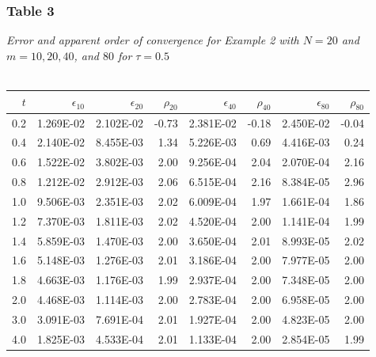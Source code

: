 \documentclass[letterpaper, 12pt]{article}
\begin{document}
	\subsubsection*{Table 3} \small\textit{Error and apparent order of convergence for Example 2 with $N=20$ and\\$m=10,20,40$, and $80$ for $\tau=0.5$} \\\\
	\normalsize
	\begin{tabular}{r||rrrrrrr}
		\hline
		$t$  &$\epsilon_{10}$  &$\epsilon_{20}$  &$\rho_{20}$  &$\epsilon_{40}$  &$\rho_{40}$  &$\epsilon_{80}$  &$\rho_{80}$ \\ 
		\hline
		0.2    &1.269E-02    &2.102E-02        &-0.73    &2.381E-02        &-0.18    &2.450E-02        &-0.04 \\ 
		0.4    &2.140E-02    &8.455E-03         &1.34    &5.226E-03         &0.69    &4.416E-03         &0.24 \\ 
		0.6    &1.522E-02    &3.802E-03         &2.00    &9.256E-04         &2.04    &2.070E-04         &2.16 \\ 
		0.8    &1.212E-02    &2.912E-03         &2.06    &6.515E-04         &2.16    &8.384E-05         &2.96 \\ 
		1.0    &9.506E-03    &2.351E-03         &2.02    &6.009E-04         &1.97    &1.661E-04         &1.86 \\ 
		1.2    &7.370E-03    &1.811E-03         &2.02    &4.520E-04         &2.00    &1.141E-04         &1.99 \\ 
		1.4    &5.859E-03    &1.470E-03         &2.00    &3.650E-04         &2.01    &8.993E-05         &2.02 \\ 
		1.6    &5.148E-03    &1.276E-03         &2.01    &3.186E-04         &2.00    &7.977E-05         &2.00 \\ 
		1.8    &4.663E-03    &1.176E-03         &1.99    &2.937E-04         &2.00    &7.348E-05         &2.00 \\ 
		2.0    &4.468E-03    &1.114E-03         &2.00    &2.783E-04         &2.00    &6.958E-05         &2.00 \\ 
		3.0    &3.091E-03    &7.691E-04         &2.01    &1.927E-04         &2.00    &4.823E-05         &2.00 \\ 
		4.0    &1.825E-03    &4.533E-04         &2.01    &1.133E-04         &2.00    &2.854E-05         &1.99 \\ 
		\hline
	\end{tabular}\\
	
\end{document}
